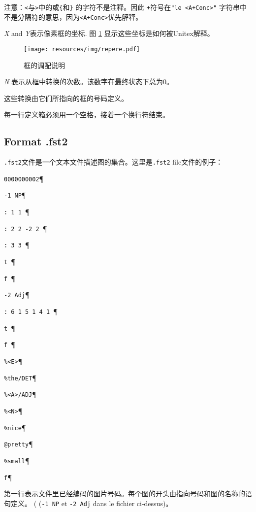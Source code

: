 \bigskip
\noindent
注意：\verb+<+与\verb+>+中的或\verb+{+和\verb+}+ 的字符不是注释。因此 \verb$+$符号在\verb$"le <A+Conc>"$ 字符串中不是分隔符的意思，因为\verb$<A+Conc>$优先解释。

\bigskip
\noindent \textit{X} and \textit{Y}表示像素框的坐标. 图
\ref{fig-box-coordinates} 显示这些坐标是如何被Unitex解释。

\begin{figure}[!h]
\begin{center}
\texttt{[image: resources/img/repere.pdf]}
\caption{框的调配说明\label{fig-box-coordinates}}
\end{center}
\end{figure}

\bigskip
\noindent \textit{N}
表示从框中转换的次数。该数字在最终状态下总为$0$。

\bigskip
\noindent 
这些转换由它们所指向的框的号码定义。

\bigskip
\noindent 
每一行定义箱必须用一个空格，接着一个换行符结束。

\subsection{Format .fst2}
\verb+.fst2+文件是一个文本文件描述图的集合。这里是\verb+.fst2+ file文件的例子：

\bigskip
\verb+0000000002+\P

\verb+-1 NP+\P

\verb+: 1 1 +\P

\verb+: 2 2 -2 2 +\P

\verb+: 3 3 +\P

\verb+t +\P

\verb+f +\P

\verb+-2 Adj+\P

\verb+: 6 1 5 1 4 1 +\P

\verb+t +\P

\verb+f +\P

\verb+%<E>+\P

\verb+%the/DET+\P

\verb+%<A>/ADJ+\P

\verb+%<N>+\P

\verb+%nice+\P

\verb+@pretty+\P

\verb+%small+\P

\verb+f+\P

\bigskip
\noindent 
第一行表示文件里已经编码的图片号码。每个图的开头由指向号码和图的名称的语句定义。 (
	(\verb+-1 NP+ et \verb+-2 Adj+ dans le fichier ci-dessus)。

